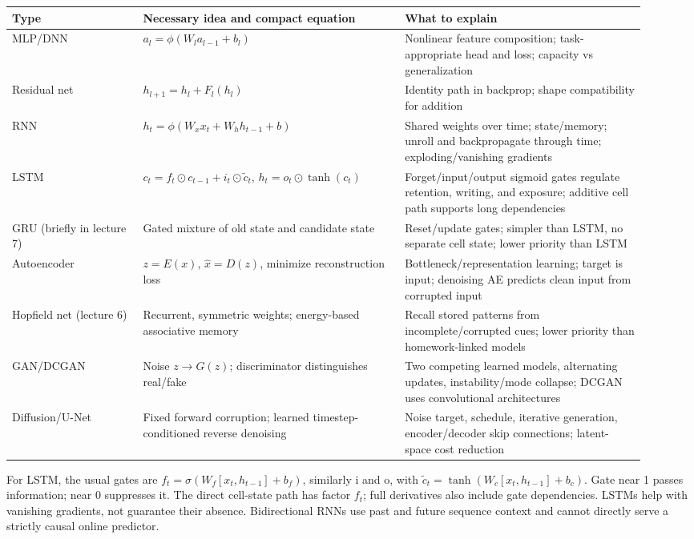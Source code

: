 \documentclass[11pt]{article}
\begin{document}
{\small\setlength{\tabcolsep}{3pt}\renewcommand{\arraystretch}{1.25}
\begin{longtable}{>{\raggedright\arraybackslash}p{0.19\linewidth}>{\raggedright\arraybackslash}p{0.38\linewidth}>{\raggedright\arraybackslash}p{0.35\linewidth}}
\toprule
Type & Necessary idea and compact equation & What to explain \\
\midrule\endhead
MLP/\allowbreak{}DNN & $a_l=\phi(W_la_{l-1}+b_l)$ & Nonlinear feature composition; task-appropriate head and loss; capacity vs generalization \\
Residual net & $h_{l+1}=h_l+F_l(h_l)$ & Identity path in backprop; shape compatibility for addition \\
RNN & $h_t=\phi(W_xx_t+W_hh_{t-1}+b)$ & Shared weights over time; state/\allowbreak{}memory; unroll and backpropagate through time; exploding/\allowbreak{}vanishing gradients \\
LSTM & $c_t=f_t\odot c_{t-1}+i_t\odot\tilde c_t$, $h_t=o_t\odot\tanh(c_t)$ & Forget/\allowbreak{}input/\allowbreak{}output sigmoid gates regulate retention, writing, and exposure; additive cell path supports long dependencies \\
GRU (briefly in lecture 7) & Gated mixture of old state and candidate state & Reset/\allowbreak{}update gates; simpler than LSTM, no separate cell state; lower priority than LSTM \\
Autoencoder & $z=E(x)$, $\hat x=D(z)$, minimize reconstruction loss & Bottleneck/\allowbreak{}representation learning; target is input; denoising AE predicts clean input from corrupted input \\
Hopfield net (lecture 6) & Recurrent, symmetric weights; energy-based associative memory & Recall stored patterns from incomplete/\allowbreak{}corrupted cues; lower priority than homework-linked models \\
GAN/\allowbreak{}DCGAN & Noise $z\to G(z)$; discriminator distinguishes real/\allowbreak{}fake & Two competing learned models, alternating updates, instability/\allowbreak{}mode collapse; DCGAN uses convolutional architectures \\
Diffusion/\allowbreak{}U-Net & Fixed forward corruption; learned timestep-conditioned reverse denoising & Noise target, schedule, iterative generation, encoder/\allowbreak{}decoder skip connections; latent-space cost reduction \\
\bottomrule\end{longtable}}

For LSTM, the usual gates are $f_t=\sigma(W_f[x_t,h_{t-1}]+b_f)$, similarly i and o, with $\tilde c_t=\tanh(W_c[x_t,h_{t-1}]+b_c)$. Gate near 1 passes information; near 0 suppresses it. The direct cell-state path has factor $f_t$; full derivatives also include gate dependencies. LSTMs help with vanishing gradients, not guarantee their absence. Bidirectional RNNs use past and future sequence context and cannot directly serve a strictly causal online predictor.
\end{document}
